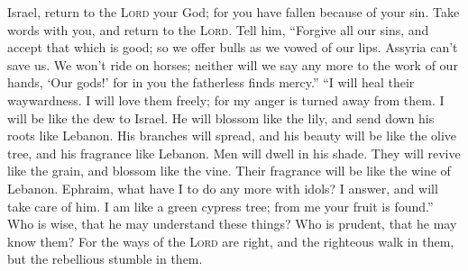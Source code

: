  Israel, return to the \textsc{Lord} your God; for you
have fallen because of your sin.  Take words with you, and
return to the \textsc{Lord}. Tell him, ``Forgive all our sins, and
accept that which is good; so we offer bulls as we vowed of our lips.
 Assyria can't save us. We won't ride on horses; neither
will we say any more to the work of our hands, `Our gods!' for in you
the fatherless finds mercy.''  ``I will heal their
waywardness. I will love them freely; for my anger is turned away from
them.  I will be like the dew to Israel. He will blossom
like the lily, and send down his roots like Lebanon.  His
branches will spread, and his beauty will be like the olive tree, and
his fragrance like Lebanon.  Men will dwell in his shade.
They will revive like the grain, and blossom like the vine. Their
fragrance will be like the wine of Lebanon.  Ephraim, what
have I to do any more with idols? I answer, and will take care of him. I
am like a green cypress tree; from me your fruit is found.''
 Who is wise, that he may understand these things? Who is
prudent, that he may know them? For the ways of the \textsc{Lord} are
right, and the righteous walk in them, but the rebellious stumble in
them.
